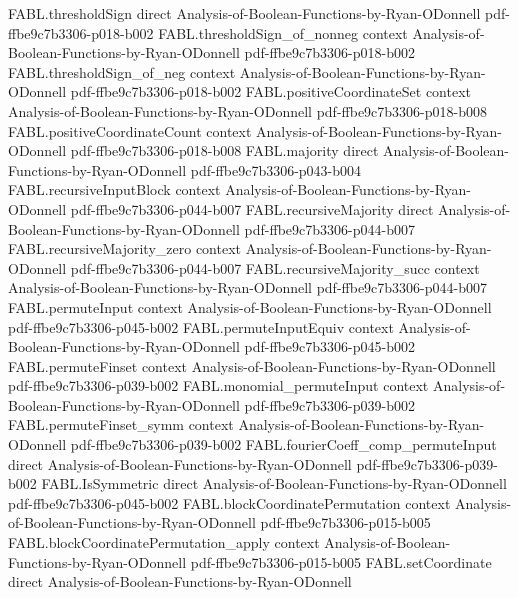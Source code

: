 \begin{theorem}
\proofstep
  {FABL.thresholdSign}
  {direct}
  {Analysis-of-Boolean-Functions-by-Ryan-ODonnell}
  {pdf-ffbe9c7b3306-p018-b002}
\proofstep
  {FABL.thresholdSign_of_nonneg}
  {context}
  {Analysis-of-Boolean-Functions-by-Ryan-ODonnell}
  {pdf-ffbe9c7b3306-p018-b002}
\proofstep
  {FABL.thresholdSign_of_neg}
  {context}
  {Analysis-of-Boolean-Functions-by-Ryan-ODonnell}
  {pdf-ffbe9c7b3306-p018-b002}
\proofstep
  {FABL.positiveCoordinateSet}
  {context}
  {Analysis-of-Boolean-Functions-by-Ryan-ODonnell}
  {pdf-ffbe9c7b3306-p018-b008}
\proofstep
  {FABL.positiveCoordinateCount}
  {context}
  {Analysis-of-Boolean-Functions-by-Ryan-ODonnell}
  {pdf-ffbe9c7b3306-p018-b008}
\proofstep
  {FABL.majority}
  {direct}
  {Analysis-of-Boolean-Functions-by-Ryan-ODonnell}
  {pdf-ffbe9c7b3306-p043-b004}
\proofstep
  {FABL.recursiveInputBlock}
  {context}
  {Analysis-of-Boolean-Functions-by-Ryan-ODonnell}
  {pdf-ffbe9c7b3306-p044-b007}
\proofstep
  {FABL.recursiveMajority}
  {direct}
  {Analysis-of-Boolean-Functions-by-Ryan-ODonnell}
  {pdf-ffbe9c7b3306-p044-b007}
\proofstep
  {FABL.recursiveMajority_zero}
  {context}
  {Analysis-of-Boolean-Functions-by-Ryan-ODonnell}
  {pdf-ffbe9c7b3306-p044-b007}
\proofstep
  {FABL.recursiveMajority_succ}
  {context}
  {Analysis-of-Boolean-Functions-by-Ryan-ODonnell}
  {pdf-ffbe9c7b3306-p044-b007}
\proofstep
  {FABL.permuteInput}
  {context}
  {Analysis-of-Boolean-Functions-by-Ryan-ODonnell}
  {pdf-ffbe9c7b3306-p045-b002}
\proofstep
  {FABL.permuteInputEquiv}
  {context}
  {Analysis-of-Boolean-Functions-by-Ryan-ODonnell}
  {pdf-ffbe9c7b3306-p045-b002}
\proofstep
  {FABL.permuteFinset}
  {context}
  {Analysis-of-Boolean-Functions-by-Ryan-ODonnell}
  {pdf-ffbe9c7b3306-p039-b002}
\proofstep
  {FABL.monomial_permuteInput}
  {context}
  {Analysis-of-Boolean-Functions-by-Ryan-ODonnell}
  {pdf-ffbe9c7b3306-p039-b002}
\proofstep
  {FABL.permuteFinset_symm}
  {context}
  {Analysis-of-Boolean-Functions-by-Ryan-ODonnell}
  {pdf-ffbe9c7b3306-p039-b002}
\proofstep
  {FABL.fourierCoeff_comp_permuteInput}
  {direct}
  {Analysis-of-Boolean-Functions-by-Ryan-ODonnell}
  {pdf-ffbe9c7b3306-p039-b002}
\proofstep
  {FABL.IsSymmetric}
  {direct}
  {Analysis-of-Boolean-Functions-by-Ryan-ODonnell}
  {pdf-ffbe9c7b3306-p045-b002}
\proofstep
  {FABL.blockCoordinatePermutation}
  {context}
  {Analysis-of-Boolean-Functions-by-Ryan-ODonnell}
  {pdf-ffbe9c7b3306-p015-b005}
\proofstep
  {FABL.blockCoordinatePermutation_apply}
  {context}
  {Analysis-of-Boolean-Functions-by-Ryan-ODonnell}
  {pdf-ffbe9c7b3306-p015-b005}
\proofstep
  {FABL.setCoordinate}
  {direct}
  {Analysis-of-Boolean-Functions-by-Ryan-ODonnell}

\end{theorem}
